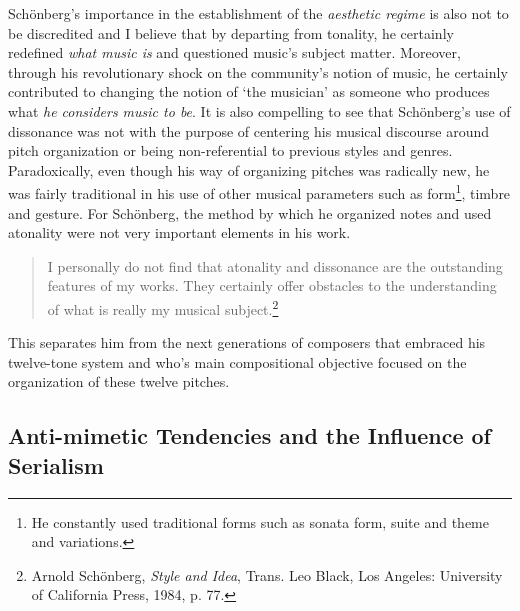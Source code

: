 Sch\"{o}nberg's importance in the establishment of the \emph{aesthetic regime} is also not to be discredited and I believe that by departing from tonality, he certainly redefined \emph{what music is} and questioned music's subject matter. Moreover, through his revolutionary shock on the community's notion of music, he certainly contributed to changing the notion of `the musician' as someone who produces what \emph{he considers music to be}. It is also compelling to see that Sch\"{o}nberg's use of dissonance was not with the purpose of centering his musical discourse around pitch organization or being non-referential to previous styles and genres. Paradoxically, even though his way of organizing pitches was radically new, he was fairly traditional in his use of other musical parameters such as form\footnote{He constantly used traditional forms such as sonata form, suite and theme and variations.}, timbre and gesture. For Sch\"{o}nberg, the method by which he organized notes and used atonality were not very important elements in his work.

\begin{quote}
I personally do not find that atonality and dissonance are the outstanding features of my works. They certainly offer obstacles to the understanding of what is really my musical subject.\footnote{Arnold Sch\"{o}nberg, \emph{Style and Idea}, Trans. Leo Black, Los Angeles: University of California Press, 1984, p. 77.}
\end{quote}
This separates him from the next generations of composers that embraced his twelve-tone system and who's main compositional objective focused on the organization of these twelve pitches. 

\subsection{Anti-mimetic Tendencies and the Influence of Serialism}

